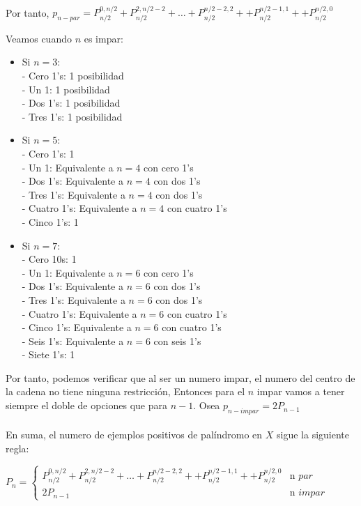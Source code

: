 \documentclass{article}
\begin{document}
\begin{enumerate}
\begin{itemize}
        \\Por tanto, \(p_{n-par}=P_{n/2}^{0,n/2}+P_{n/2}^{2,n/2-2}+\ldots+P_{n/2}^{n/2-2,2}++P_{n/2}^{n/2-1,1}++P_{n/2}^{n/2,0}\)
    \end{itemize}
    Veamos cuando \(n\) es impar:
    \begin{itemize}
        \item Si \(n = 3\):
        \\- Cero 1's: 1 posibilidad
        \\- Un 1: 1 posibilidad
        \\- Dos 1's: 1 posibilidad
        \\- Tres 1's: 1 posibilidad
        \item Si \(n = 5\):
        \\- Cero 1's: 1
        \\- Un 1: Equivalente a \(n = 4\) con cero 1's
        \\- Dos 1's: Equivalente a \(n = 4\) con dos 1's
        \\- Tres 1's: Equivalente a \(n = 4\) con dos 1's
        \\- Cuatro 1's: Equivalente a \(n = 4\) con cuatro 1's
        \\- Cinco 1's: 1
        \item Si \(n = 7\):
        \\- Cero 10s: 1
        \\- Un 1: Equivalente a \(n = 6\) con cero 1's
        \\- Dos 1's: Equivalente a \(n = 6\) con dos 1's
        \\- Tres 1's: Equivalente a \(n = 6\) con dos 1's
        \\- Cuatro 1's: Equivalente a \(n = 6\) con cuatro 1's
        \\- Cinco 1's: Equivalente a \(n = 6\) con cuatro 1's
        \\- Seis 1's: Equivalente a \(n = 6\) con seis 1's
        \\- Siete 1's: 1
    \end{itemize}
    Por tanto, podemos verificar que al ser un numero impar, el numero del centro de la cadena no tiene ninguna restricción, Entonces para el \(n\) impar vamos a tener siempre el doble de opciones  que para \(n-1\). Osea \(p_{n-impar}=2P_{n-1}\)
    \\\\En suma, el numero de ejemplos positivos de palíndromo en \(X\) sigue la siguiente regla:
    \begin{center}
    \(P_n =
    \left\{
    	\begin{array}{ll}
    		P_{n/2}^{0,n/2}+P_{n/2}^{2,n/2-2}+\ldots+P_{n/2}^{n/2-2,2}++P_{n/2}^{n/2-1,1}++P_{n/2}^{n/2,0}  & \mbox{n } par  \\
    		2P_{n-1} & \mbox{n } impar
    	\end{array}
    \right.
    \)
    \end{center}
    

\end{enumerate}
\end{document}
